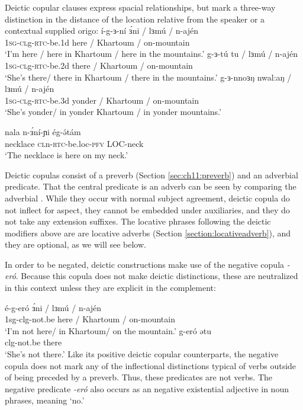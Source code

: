 Deictic copular clauses express spacial relationships, but mark a three-way distinction in the distance of the location relative from the speaker or a contextual supplied origo:
\ea 
	\ea \gll   í-g-ɜ-ní 		ɜ́ni / lɜmú / n-ajén \\ 
				\textsc{1sg}-\textsc{cl}g-\textsc{rtc}-be.1d	here / Khartoum / on-mountain \\
		\glt 	`I'm here / here in Khartoum / here in the mountains.’
	\ex \gll   g-ɜ-tú 		tu / lɜmú / n-ajén \\ 
				\textsc{1sg}-\textsc{cl}g-\textsc{rtc}-be.2d	there / Khartoum / on-mountain \\
		\glt 	`She's there/ there in Khartoum / there in the mountains.’
	\ex \gll   g-ɜ-nnoɜŋ 		nwal:aŋ / lɜmú / n-ajén \\ 
				\textsc{1sg}-\textsc{cl}g-\textsc{rtc}-be.3d	yonder / Khartoum / on-mountain \\
		\glt 	`She's yonder/ in yonder Khartoum / in yonder mountains.’
\z 
\z 

\ea 	\gll nala		n-ɜ́ní-ɲi		ég-ə́tám	\\
			necklace	\textsc{cl}n-\textsc{rtc}-be.loc-\textsc{pfv} LOC-neck\\
		\glt	‘The necklace is here on my neck.’
\z %


Deictic copulas consist of a preverb (Section \ref{sec:ch11:preverb}) and an adverbial predicate. That the central predicate is an adverb can be seen by comparing the adverbial . While they occur with normal subject agreement, deictic copula do not inflect for aspect, they cannot be embedded under auxiliaries, and they do not take any extension suffixes. The locative phrases following the deictic modifiers above are are locative adverbs (Section \ref{section:locativeadverb}), and they are optional, as we will see below.

In order to be negated, deictic constructions make use of the negative copula \textit{-eró}. Because this copula does not make deictic distinctions, these are neutralized in this context unless they are explicit in the complement:

\ea 
	\ea \gll	é-g-eró			ɜ́ni	/ lɜmú / n-ajén \\									
				1sg-clg-not.be	here / Khartoum / on-mountain \\			
		\glt 	‘I’m not here/ in Khartoum/ on the mountain.’
	\ex \gll 	g-eró			ətu			\\							
				clg-not.be		there		\\
		\glt	‘She’s not there.’
\z 
\z 
Like its positive deictic copular counterparts, the negative copula does not mark any of the inflectional distinctions typical of verbs outside of being preceded by a preverb. Thus, these predicates are not verbs. The negative predicate \textit{-eró} also occurs as an negative existential adjective in noun phrases, meaning `no.'

